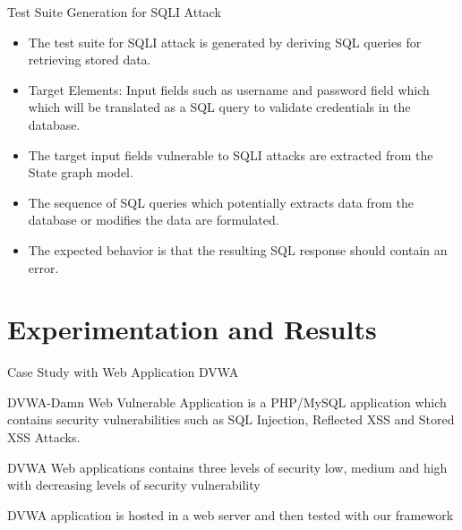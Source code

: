\documentclass{beamer}
\begin{document}
\begin{frame}{Test Suite Generation for SQLI Attack}
\begin{itemize}
    \item The test suite for SQLI attack is generated by deriving SQL queries for retrieving stored data. 
    \item Target Elements: Input fields such as username and password field which which will be translated as a SQL query to validate credentials in the database. 
    \item The target input fields vulnerable to SQLI attacks are extracted from the State graph model. 
    \item The sequence of SQL queries which potentially extracts data from the database or modifies the data are formulated. 
    \item The expected behavior is that the resulting SQL response should contain an error.


\end{itemize}
\end{frame}

\section {Experimentation and Results}
\begin{frame}{Case Study with Web Application DVWA}

\item DVWA-Damn Web Vulnerable Application is a PHP/MySQL application which
contains security vulnerabilities such as SQL Injection, Reflected XSS and Stored XSS Attacks.
\item DVWA Web applications contains three levels of security low, medium and high with decreasing levels of security vulnerability
\item DVWA application is hosted in a web server and then tested with our framework

\end{frame}
\end{document}

